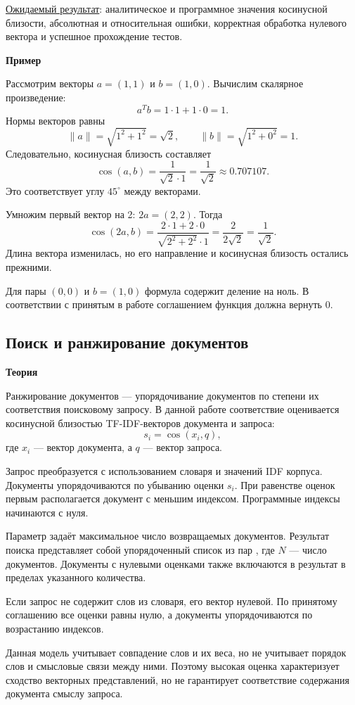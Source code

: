 \documentclass[12pt,a4paper]{article}
\newcommand{\micro}[1]{\subsection{#1}}
\newcommand{\taskhead}[1]{\par\textbf{#1}\par}
\begin{document}
\underline{Ожидаемый результат}: аналитическое
и программное значения косинусной близости,
абсолютная и относительная ошибки, корректная обработка
нулевого вектора и успешное прохождение тестов.

\taskhead{Пример}

Рассмотрим векторы $a=(1,1)$ и $b=(1,0)$.
Вычислим скалярное произведение:
\[
a^Tb=1\cdot1+1\cdot0=1.
\]
Нормы векторов равны
\[
\|a\|=\sqrt{1^2+1^2}=\sqrt2,\qquad
\|b\|=\sqrt{1^2+0^2}=1.
\]
Следовательно, косинусная близость составляет
\[
\operatorname{cos}(a,b)
=\frac{1}{\sqrt2\cdot1}
=\frac{1}{\sqrt2}\approx0.707107.
\]
Это соответствует углу $45^\circ$ между векторами.

Умножим первый вектор на 2: $2a=(2,2)$.
Тогда
\[
\operatorname{cos}(2a,b)
=\frac{2\cdot1+2\cdot0}{\sqrt{2^2+2^2}\cdot1}
=\frac{2}{2\sqrt2}
=\frac{1}{\sqrt2}.
\]
Длина вектора изменилась, но его направление
и косинусная близость остались прежними.

Для пары $(0,0)$ и $b=(1,0)$ формула содержит деление
на ноль. В соответствии с принятым в работе соглашением
функция должна вернуть $0$.

\micro{Поиск и ранжирование документов}
\taskhead{Теория}

Ранжирование документов --- упорядочивание документов
по степени их соответствия поисковому запросу.
В данной работе соответствие оценивается косинусной
близостью TF-IDF-векторов документа и запроса:
\[
s_i=\operatorname{cos}(x_i,q),
\]
где $x_i$ --- вектор документа, а $q$ --- вектор запроса.

Запрос преобразуется с использованием словаря
и значений IDF корпуса. Документы упорядочиваются
по убыванию оценки $s_i$.
При равенстве оценок первым располагается документ
с меньшим индексом. Программные индексы начинаются с нуля.

Параметр  задаёт максимальное число
возвращаемых документов. Результат поиска представляет
собой упорядоченный список из  пар
, где $N$ --- число документов.
Документы с нулевыми оценками также включаются
в результат в пределах указанного количества.

Если запрос не содержит слов из словаря,
его вектор нулевой. По принятому соглашению
все оценки равны нулю, а документы упорядочиваются
по возрастанию индексов.

Данная модель учитывает совпадение слов и их веса,
но не учитывает порядок слов и смысловые связи между ними.
Поэтому высокая оценка характеризует сходство
векторных представлений, но не гарантирует соответствие
содержания документа смыслу запроса.
\end{document}
